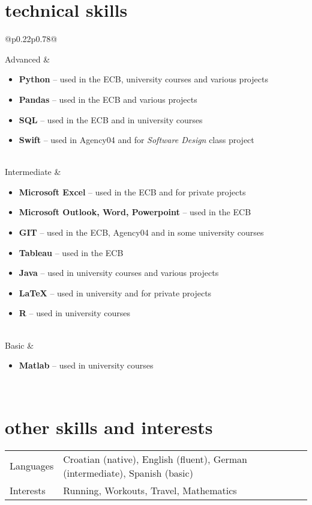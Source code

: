 \documentclass[a4paper]{article}
\makeatletter
\newlength{\tablewidth}
\newenvironment{skills}{%
\setlength{\tablewidth}{\linewidth}
\addtolength{\tablewidth}{-2\tabcolsep}
\begin{tabular}{@{}p{0.22\tablewidth}p{0.78\tablewidth}@{}}
}{%
\end{tabular}
}
\makeatother
\begin{document}
\section{technical skills}
\begin{skills}
    Advanced &
    \begin{itemize}
        \item \textbf{Python} -- used in the ECB, university courses and various projects
        \item \textbf{Pandas} -- used in the ECB and various projects
        \item \textbf{SQL} -- used in the ECB and in university courses
        \item \textbf{Swift} -- used in Agency04 and for \textit{Software Design} class project

    \end{itemize} \\
    Intermediate &
    \begin{itemize}
        \item \textbf{Microsoft Excel} -- used in the ECB and for private projects
        \item \textbf{Microsoft Outlook, Word, Powerpoint} -- used in the ECB
        \item \textbf{GIT} -- used in the ECB, Agency04 and in some university courses
        \item \textbf{Tableau} -- used in the ECB
        \item \textbf{Java} -- used in university courses and various projects
        \item \textbf{LaTeX} -- used in university and for private projects
        \item \textbf{R} -- used in university courses

    \end{itemize} \\
    Basic &
    \begin{itemize}
        \item \textbf{Matlab} -- used in university courses
    \end{itemize} \\
\end{skills}

\section{other skills and interests}
\begin{skills}
    Languages & Croatian (native), English (fluent), German (intermediate), Spanish (basic) \\
    Interests & Running, Workouts, Travel, Mathematics \\
\end{skills}
\end{document}
